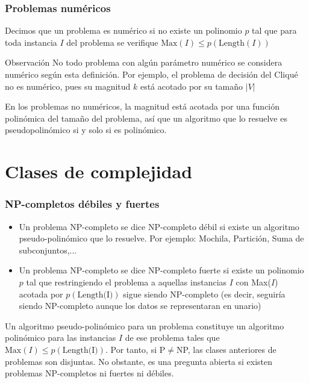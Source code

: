 \documentclass{beamer}
\begin{document}
\begin{frame}
	\frametitle{Problemas numéricos}
	Decimos que un problema es \alert{numérico} si no existe un polinomio $p$ tal que para toda instancia $I$ del problema se verifique $\text{Max}(I)\leq p(\text{Length}(I))$
	\begin{block}{Observación}
		No todo problema con algún parámetro numérico se considera numérico según esta definición. Por ejemplo, el problema de decisión del Cliqué no es numérico, pues su magnitud $k$ está acotado por su tamaño $|V|$
	\end{block}

    En los problemas no numéricos, la magnitud está acotada por una función polinómica del tamaño del problema, así que un algoritmo que lo resuelve es pseudopolinómico si y solo si es polinómico.
\end{frame}

\section{Clases de complejidad}
\begin{frame}
	\frametitle{NP-completos débiles y fuertes}
	\begin{itemize}
		\item Un problema NP-completo se dice \alert{NP-completo débil} si existe un algoritmo pseudo-polinómico que lo resuelve. Por ejemplo: Mochila, Partición, Suma de subconjuntos,...
		\item Un problema NP-completo se dice \alert{NP-completo fuerte} si existe un polinomio $p$ tal que restringiendo el problema a aquellas instancias $I$ con Max($I$) acotada por $p(\text{Length(I)})$ sigue siendo NP-completo (es decir, seguiría siendo NP-completo aunque los datos se representaran en unario)
		\end{itemize}
		
       	Un algoritmo pseudo-polinómico para un problema constituye un algoritmo polinómico para las instancias $I$ de ese problema tales que $\text{Max}(I)\leq p(\text{Length(I)})$. Por tanto, si P$\neq$NP, las clases anteriores de problemas son disjuntas. No obstante, es una pregunta abierta si existen problemas NP-completos ni fuertes ni débiles.
       	
	\end{frame}
\end{document}
